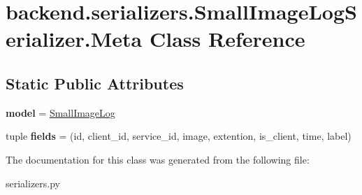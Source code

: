\hypertarget{classbackend_1_1serializers_1_1_small_image_log_serializer_1_1_meta}{}\section{backend.\+serializers.\+Small\+Image\+Log\+Serializer.\+Meta Class Reference}
\label{classbackend_1_1serializers_1_1_small_image_log_serializer_1_1_meta}
\subsection*{Static Public Attributes}
\begin{DoxyCompactItemize}
\item 
\mbox{\label{classbackend_1_1serializers_1_1_small_image_log_serializer_1_1_meta_a621764f37d90f62beaa2c9da8caaf26b}} 
{\bfseries model} = \hyperlink{classbackend_1_1models_1_1_small_image_log}{Small\+Image\+Log}
\item 
\mbox{\label{classbackend_1_1serializers_1_1_small_image_log_serializer_1_1_meta_a772311e5544e3426c23c18a7e1a85074}} 
tuple {\bfseries fields} = (\textquotesingle{}id\textquotesingle{}, \textquotesingle{}client\+\_\+id\textquotesingle{}, \textquotesingle{}service\+\_\+id\textquotesingle{}, \textquotesingle{}image\textquotesingle{}, \textquotesingle{}extention\textquotesingle{}, \textquotesingle{}is\+\_\+client\textquotesingle{}, \textquotesingle{}time\textquotesingle{}, \textquotesingle{}label\textquotesingle{})
\end{DoxyCompactItemize}


The documentation for this class was generated from the following file\+:\begin{DoxyCompactItemize}
\item 
serializers.\+py\end{DoxyCompactItemize}
